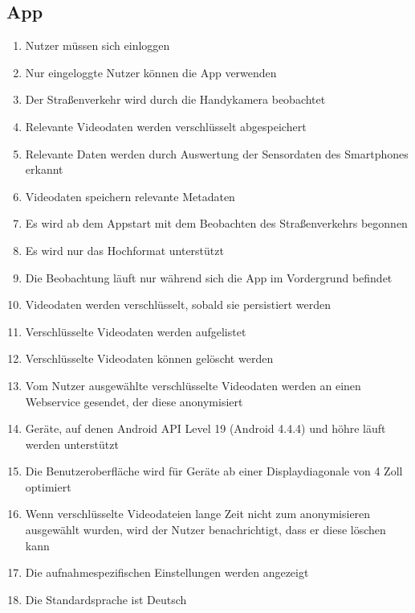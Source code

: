 \subsection{App}
	\begin{enumerate}[\bfseries{/PK}1010/]
	\item Nutzer müssen sich einloggen
	\item Nur eingeloggte Nutzer können die App verwenden 
	\item Der Straßenverkehr wird durch die Handykamera beobachtet 
	\item Relevante Videodaten werden verschlüsselt abgespeichert
	\item Relevante Daten werden durch Auswertung der Sensordaten des Smartphones erkannt
	\item Videodaten speichern relevante Metadaten
	\item Es wird ab dem Appstart mit dem Beobachten des Straßenverkehrs begonnen
	\item Es wird nur das Hochformat unterstützt
	\item Die Beobachtung läuft nur während sich die App im Vordergrund befindet
	\item Videodaten werden verschlüsselt, sobald sie persistiert werden
	\item Verschlüsselte Videodaten werden aufgelistet
	\item Verschlüsselte Videodaten können gelöscht werden
	\item Vom Nutzer ausgewählte verschlüsselte Videodaten werden an einen Webservice gesendet, der diese anonymisiert
	\item Geräte, auf denen Android API Level 19 (Android 4.4.4) und höhre läuft werden unterstützt
	\item Die Benutzeroberfläche wird für Geräte ab einer Displaydiagonale von 4 Zoll optimiert
	\item Wenn verschlüsselte Videodateien lange Zeit nicht zum anonymisieren ausgewählt wurden, wird der Nutzer benachrichtigt, dass er diese löschen kann
	\item Die aufnahmespezifischen Einstellungen werden angezeigt
	\item Die Standardsprache ist Deutsch
	\end{enumerate}
